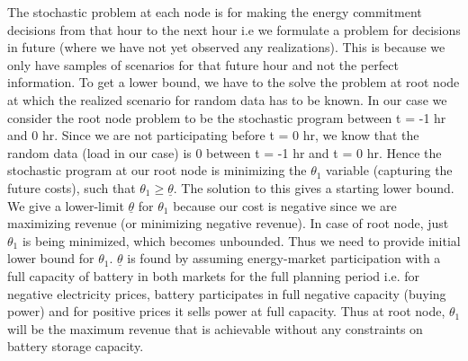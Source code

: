 \documentclass[11pt,twoside]{article}
\begin{document}
The stochastic problem at each node is for making the energy commitment decisions from that hour to the next hour i.e we formulate a problem for decisions in future (where we have not yet observed any realizations). This is because we only have samples of scenarios for that future hour and not the perfect information. To get a lower bound, we have to the solve the problem at root node at which the realized scenario for random data has to be known. In our case we consider the root node problem to be the stochastic program between t = -1 hr and 0 hr. Since we are not participating before t = 0 hr, we know that the random data (load in our case) is 0 between t = -1 hr and t = 0 hr. Hence the stochastic program at our root node is minimizing the $\theta_{1}$ variable (capturing the future costs), such that $\theta_{1} \geq \underline{\theta}$. The solution to this gives a starting lower bound. We give a lower-limit $\underline{\theta}$ for $\theta_1$ because our cost is negative since we are maximizing revenue (or minimizing negative revenue). In case of root node, just $\theta_1$ is being minimized, which becomes unbounded. Thus we need to provide initial lower bound for $\theta_1$. $\underline{\theta}$ is found by assuming energy-market participation with a full capacity of battery in both markets for the full planning period i.e. for negative electricity prices, battery participates in full negative capacity (buying power) and for positive prices it sells power at full capacity. Thus at root node, $\theta_1$ will be the maximum revenue that is achievable without any constraints on battery storage capacity.   
\end{document}

